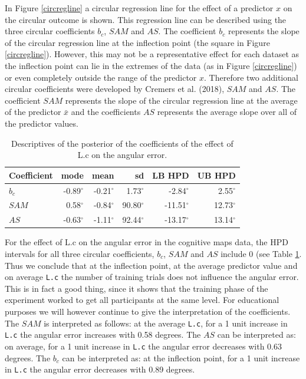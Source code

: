 \documentclass[11pt,]{article}
\begin{document}
In Figure \ref{circregline} a circular regression line for the effect of
a predictor \(x\) on the circular outcome is shown. This regression line
can be described using the three circular coefficients \(b_c\), \(SAM\)
and \(AS\). The coefficient \(b_c\) represents the slope of the circular
regression line at the inflection point (the square in Figure
\ref{circregline}). However, this may not be a representative effect for
each dataset as the inflection point can lie in the extremes of the data
(as in Figure \ref{circregline}) or even completely outside the range of
the predictor \(x\). Therefore two additional circular coefficients were
developed by Cremers et al. (2018), \(SAM\) and \(AS\). The coefficient
\(SAM\) represents the slope of the circular regression line at the
average of the predictor \(\bar{x}\) and the coefficients \(AS\)
represents the average slope over all of the predictor values.

\begin{table}
\centering
\caption{Descriptives of the posterior of the coefficients of the effect of L.c on the angular error.} 
\begin{tabular}{lrrrrr}
  \hline\noalign{\smallskip}
Coefficient & mode & mean & sd & LB HPD & UB HPD  \\ \hline\noalign{\smallskip}
$b_c$ & -0.89$^{\circ}$ & -0.21$^{\circ}$ & 1.73$^{\circ}$ & -2.84$^{\circ}$ & 2.55$^{\circ}$\\
$SAM$ &  0.58$^{\circ}$ & -0.84$^{\circ}$ & 90.80$^{\circ}$ & -11.51$^{\circ}$ & 12.73$^{\circ}$   \\
$AS$  & -0.63$^{\circ}$  & -1.11$^{\circ}$  & 92.44$^{\circ}$ & -13.17$^{\circ}$ & 13.14$^{\circ}$ \\
   \hline
\end{tabular}
\label{TableResMapsLc}
\end{table}

For the effect of L.c on the angular error in the cognitive maps data,
the HPD intervals for all three circular coefficients, \(b_c\), \(SAM\)
and \(AS\) include 0 (see Table \ref{TableResMapsLc}. Thus we conclude
that at the inflection point, at the average predictor value and on
average \verb|L.c| the number of training trials does not influence the
angular error. This is in fact a good thing, since it shows that the
training phase of the experiment worked to get all participants at the
same level. For educational purposes we will however continue to give
the interpretation of the coefficients. The \(SAM\) is interpreted as
follows: at the average \verb|L.c|, for a 1 unit increase in \verb|L.c|
the angular error increases with 0.58 degrees. The \(AS\) can be
interpreted as: on average, for a 1 unit increase in \verb|L.c| the
angular error decreases with 0.63 degrees. The \(b_c\) can be
interpreted as: at the inflection point, for a 1 unit increase in
\verb|L.c| the angular error decreases with 0.89 degrees.
\end{document}
